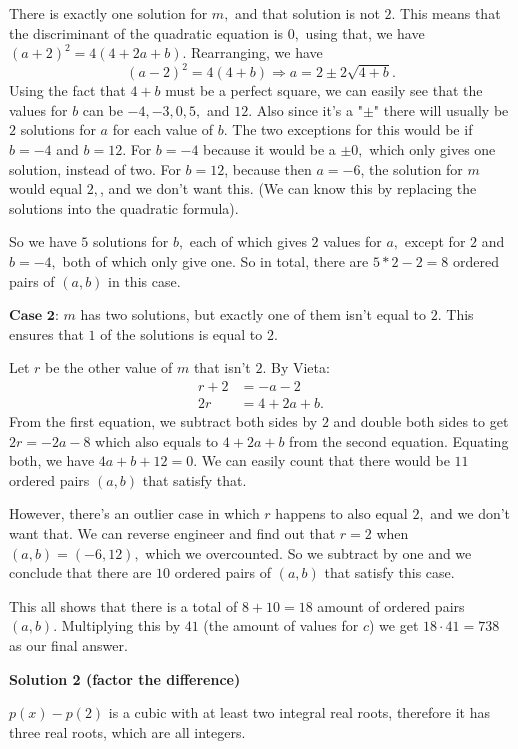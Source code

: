 \begin{enumerate}
{{ There is exactly one solution for $m,$ and that solution is not $2.$ This means that the discriminant of the quadratic equation is $0,$ using that, we have $(a+2)^2 = 4(4 + 2a + b)$. Rearranging, we have 
 \[(a-2)^2 = 4(4 + b)\Longrightarrow a = 2\pm2\sqrt{4+b}.\] Using the fact that $4+b$ must be a perfect square, we can easily see that the values for $b$ can be $-4, -3, 0, 5,$ and $12.$ Also since it's a "$\pm$" there will usually be $2$ solutions for $a$ for each value of $b.$ The two exceptions for this would be if $b = -4$ and $b = 12.$ For $b=-4$ because it would be a $\pm0,$ which only gives one solution, instead of two. For $b=12$, because then $a = -6$, the solution for $m$ would equal $2,$, and we don't want this. (We can know this by replacing the solutions into the quadratic formula). 

 So we have $5$ solutions for $b,$ each of which gives $2$ values for $a,$ except for $2$ and $b = -4,$ both of which only give one. So in total, there are $5*2 - 2 = 8$ ordered pairs of $(a,b)$ in this case.

 
$\textbf{Case 2:}$
$m$ has two solutions, but exactly one of them isn't equal to $2.$ This ensures that $1$ of the solutions is equal to $2.$

 Let $r$ be the other value of $m$ that isn't $2.$ By Vieta: 
 \begin{align*} r+2 &= -a-2\\ 2r &= 4+2a+b. \end{align*}
 From the first equation, we subtract both sides by $2$ and double both sides to get $2r = -2a - 8$ which also equals to $4+2a+b$ from the second equation. Equating both, we have $4a + b + 12 = 0.$ We can easily count that there would be $11$ ordered pairs $(a,b)$ that satisfy that.

 However, there's an outlier case in which $r$ happens to also equal $2,$ and we don't want that. We can reverse engineer and find out that $r=2$ when $(a,b) = (-6, 12),$ which we overcounted. So we subtract by one and we conclude that there are $10$ ordered pairs of $(a,b)$ that satisfy this case.

 
This all shows that there is a total of $8+10 = 18$ amount of ordered pairs $(a,b).$ Multiplying this by $41$ (the amount of values for $c$) we get $18\cdot41=\boxed{738}$ as our final answer.

 



\textbf{Solution 2 (factor the difference)}

$p(x)-p(2)$ is a cubic with at least two integral real roots, therefore it has three real roots, which are all integers.

}}
\end{enumerate}

